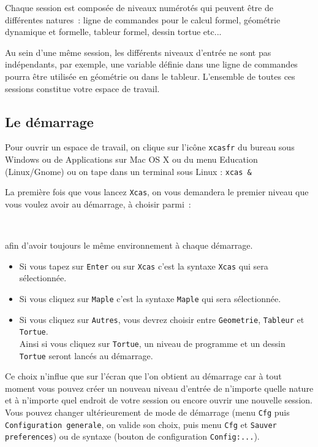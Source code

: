 \documentclass[a4paper,11pt]{article}
\begin{document}
Chaque session est compos\'ee de niveaux num\'erot\'es qui peuvent \^etre de 
diff\'erentes natures~: ligne de commandes pour le calcul formel, 
g\'eom\'etrie dynamique et formelle, tableur formel, dessin tortue etc... 

Au sein d'une m\^eme session, les  diff\'erents niveaux d'entr\'ee ne sont pas 
ind\'ependants, par exemple, une variable d\'efinie dans une ligne de commandes
pourra \^etre utilis\'ee en g\'eom\'etrie ou dans le tableur.
L'ensemble de toutes ces sessions constitue votre espace de travail.

\subsection{Le d\'emarrage}
Pour ouvrir un espace de travail, on clique sur l'ic\^one {\tt xcasfr} du 
bureau sous Windows ou de Applications sur Mac OS X ou du menu Education
(Linux/Gnome) ou on tape dans un terminal sous Linux : {\tt xcas \&}

La premi\`ere fois que vous lancez {\tt Xcas}, 
on vous demandera le premier niveau que vous voulez avoir au d\'emarrage, \`a 
choisir parmi~:
\begin{center}
{\tt {}   }
\end{center}
afin d'avoir toujours le m\^eme environnement \`a chaque d\'emarrage.
\begin{itemize}
\item Si vous tapez sur {\tt Enter} ou sur {\tt Xcas} c'est 
la syntaxe {\tt Xcas} qui sera s\'electionn\'ee. 
\item Si vous cliquez sur {\tt Maple} c'est 
la syntaxe {\tt Maple} qui sera s\'electionn\'ee. 
\item Si vous cliquez sur {\tt Autres}, vous devrez choisir 
entre {\tt Geometrie}, {\tt Tableur} et {\tt Tortue}. \\
Ainsi si vous cliquez sur {\tt Tortue}, 
un niveau de programme et un dessin {\tt Tortue} 
seront lanc\'es au d\'emarrage.
\end{itemize}
Ce choix n'influe que sur l'\'ecran que l'on obtient au 
d\'emarrage car \`a tout moment vous pouvez cr\'eer un nouveau niveau 
d'entr\'ee de n'importe quelle nature et \`a n'importe quel endroit de votre 
session ou encore ouvrir une nouvelle session. Vous pouvez changer 
ult\'erieurement de mode de d\'emarrage (menu {\tt Cfg} puis 
{\tt Configuration generale}, on valide son choix, puis menu  {\tt Cfg} et 
{\tt Sauver preferences}) ou de syntaxe (bouton de configuration 
{\tt Config:...}).
\end{document}
